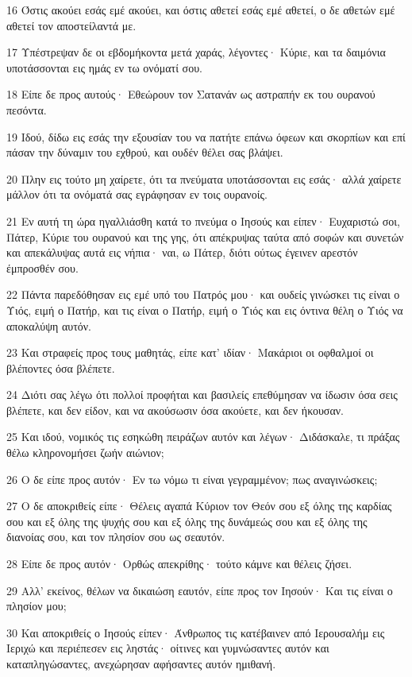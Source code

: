 \par 16 Όστις ακούει εσάς εμέ ακούει, και όστις αθετεί εσάς εμέ αθετεί, ο δε αθετών εμέ αθετεί τον αποστείλαντά με.
\par 17 Υπέστρεψαν δε οι εβδομήκοντα μετά χαράς, λέγοντες· Κύριε, και τα δαιμόνια υποτάσσονται εις ημάς εν τω ονόματί σου.
\par 18 Είπε δε προς αυτούς· Εθεώρουν τον Σατανάν ως αστραπήν εκ του ουρανού πεσόντα.
\par 19 Ιδού, δίδω εις εσάς την εξουσίαν του να πατήτε επάνω όφεων και σκορπίων και επί πάσαν την δύναμιν του εχθρού, και ουδέν θέλει σας βλάψει.
\par 20 Πλην εις τούτο μη χαίρετε, ότι τα πνεύματα υποτάσσονται εις εσάς· αλλά χαίρετε μάλλον ότι τα ονόματά σας εγράφησαν εν τοις ουρανοίς.
\par 21 Εν αυτή τη ώρα ηγαλλιάσθη κατά το πνεύμα ο Ιησούς και είπεν· Ευχαριστώ σοι, Πάτερ, Κύριε του ουρανού και της γης, ότι απέκρυψας ταύτα από σοφών και συνετών και απεκάλυψας αυτά εις νήπια· ναι, ω Πάτερ, διότι ούτως έγεινεν αρεστόν έμπροσθέν σου.
\par 22 Πάντα παρεδόθησαν εις εμέ υπό του Πατρός μου· και ουδείς γινώσκει τις είναι ο Υιός, ειμή ο Πατήρ, και τις είναι ο Πατήρ, ειμή ο Υιός και εις όντινα θέλη ο Υιός να αποκαλύψη αυτόν.
\par 23 Και στραφείς προς τους μαθητάς, είπε κατ' ιδίαν· Μακάριοι οι οφθαλμοί οι βλέποντες όσα βλέπετε.
\par 24 Διότι σας λέγω ότι πολλοί προφήται και βασιλείς επεθύμησαν να ίδωσιν όσα σεις βλέπετε, και δεν είδον, και να ακούσωσιν όσα ακούετε, και δεν ήκουσαν.
\par 25 Και ιδού, νομικός τις εσηκώθη πειράζων αυτόν και λέγων· Διδάσκαλε, τι πράξας θέλω κληρονομήσει ζωήν αιώνιον;
\par 26 Ο δε είπε προς αυτόν· Εν τω νόμω τι είναι γεγραμμένον; πως αναγινώσκεις;
\par 27 Ο δε αποκριθείς είπε· Θέλεις αγαπά Κύριον τον Θεόν σου εξ όλης της καρδίας σου και εξ όλης της ψυχής σου και εξ όλης της δυνάμεώς σου και εξ όλης της διανοίας σου, και τον πλησίον σου ως σεαυτόν.
\par 28 Είπε δε προς αυτόν· Ορθώς απεκρίθης· τούτο κάμνε και θέλεις ζήσει.
\par 29 Αλλ' εκείνος, θέλων να δικαιώση εαυτόν, είπε προς τον Ιησούν· Και τις είναι ο πλησίον μου;
\par 30 Και αποκριθείς ο Ιησούς είπεν· Άνθρωπος τις κατέβαινεν από Ιερουσαλήμ εις Ιεριχώ και περιέπεσεν εις ληστάς· οίτινες και γυμνώσαντες αυτόν και καταπληγώσαντες, ανεχώρησαν αφήσαντες αυτόν ημιθανή.
